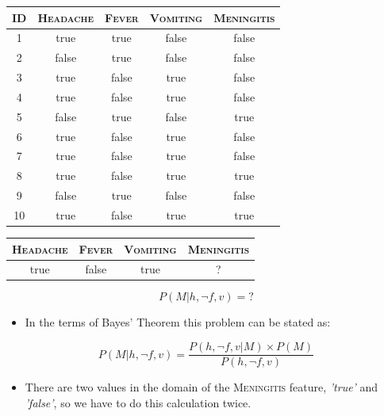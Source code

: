 \documentclass[xcolor={table}]{beamer}
\newcommand{\featN}[1]{\textsc{#1}}
\newcommand{\featL}[1]{\textit{'#1'}}
\begin{document}
 \begin{frame} 
\begin{table}[!tb]
\centering
\begin{footnotesize}
\begin{tabular}{ccccc}
\hline
\featN{ID} & \featN{Headache} & \featN{Fever} & \featN{Vomiting} & \featN{Meningitis}\\
\hline
1 & true & true & false & false\\
2 & false & true & false & false\\
3 & true & false & true & false\\
4 & true & false & true & false\\
5 & false & true & false & true\\
6 & true & false & true & false\\
7 & true & false & true & false\\
8 & true & false & true & true\\
9 & false & true & false & false\\
10 & true & false & true & true\\
\hline
\end{tabular}
\end{footnotesize}
\end{table}
 \begin{table}
\centering
\begin{footnotesize}
\begin{tabular}{cccc}
\hline
\featN{Headache} & \featN{Fever} & \featN{Vomiting} & \featN{Meningitis}\\
\hline
true & false & true & ?\\
\hline
\end{tabular}
\end{footnotesize}
\label{tab:bayes-ex1-query}
\end{table}%
\end{frame} 

 \begin{frame} 
\begin{equation*}
P(M| h, \lnot f, v)=?
\end{equation*}
 \begin{itemize}
 	\item In the terms of Bayes' Theorem this problem can be stated as:
\end{itemize}
\begin{equation*}
P(M| h, \lnot f, v)=\frac{P(h,\lnot f, v|M) \times  P(M)}{P(h, \lnot f, v)}
\end{equation*}
 \begin{itemize}
 	\item There are two values in the domain of the \featN{Meningitis} feature, \featL{true} and \featL{false}, so we have to do this calculation twice. 
\end{itemize}
\end{frame} 
\end{document}
